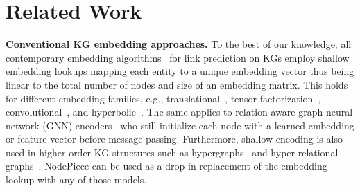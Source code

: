 \documentclass{article} \usepackage{iclr2022_conference,times}
\begin{document}
\begin{table}[t]
\centering
\caption{Node embedding sizes of state-of-the-art KG embedding models compared to BERT Large. Parameters of type \emph{float32} take 4 bytes each. FB15k-237, WN18RR, and YAGO3-10 models as reported in \citet{DBLP:conf/iclr/SunDNT19}, OGB WikiKG2 as in \citet{zhang2019autosf}, Wikidata 5M as in \citet{DBLP:journals/tacl/WangGZZLLT21}, PBG Wikidata as in \citet{pbg}, and BERT Large as in \citet{DBLP:conf/naacl/DevlinCLT19}.}
\label{tab:intro_params}
\end{table}



\section{Related Work}

\textbf{Conventional KG embedding approaches.} 
To the best of our knowledge, all contemporary embedding algorithms~\citep{DBLP:journals/corr/abs-2002-00388, DBLP:journals/corr/abs-2006-13365} for link prediction on KGs employ shallow embedding lookups mapping each entity to a unique embedding vector thus being linear  to the total number of nodes  and size of an embedding matrix. 
This holds for different embedding families, e.g., translational~\citep{DBLP:conf/iclr/SunDNT19}, tensor factorization~\citep{DBLP:conf/icml/LacroixUO18}, convolutional~\citep{DBLP:conf/aaai/DettmersMS018}, and hyperbolic~\citep{DBLP:conf/acl/ChamiWJSRR20,DBLP:conf/nips/BalazevicAH19}. 
The same applies to relation-aware graph neural network (GNN) encoders~\citep{DBLP:conf/esws/SchlichtkrullKB18,Vashishth2020Composition-based} who still initialize each node with a learned embedding or feature vector before message passing.
Furthermore, shallow encoding is also used in higher-order KG structures such as hypergraphs~\citep{DBLP:conf/ijcai/FatemiTV020} and hyper-relational graphs~\citep{10.1145/3366423.3380257,galkin-etal-2020-message}.
NodePiece can be used as a drop-in replacement of the embedding lookup with any of those models.
\end{document}
